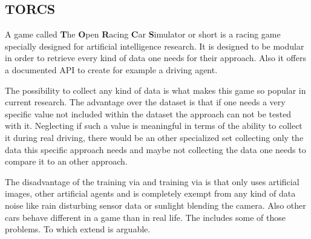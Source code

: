 \subsection{TORCS} \label{subsec: TORCS}

A game called \textbf{T}he \textbf{O}pen \textbf{R}acing \textbf{C}ar \textbf{S}imulator or short \torcs is a racing game specially designed for artificial intelligence research. It is designed to be modular in order to retrieve every kind of data one needs for their approach. Also it offers a documented API to create for example a driving agent. 

The possibility to collect any kind of data is what makes this game so popular in current research. The advantage over the \kitti dataset is that if one needs a very specific value not included within the \kitti dataset the approach can not be tested with it. Neglecting if such a value is meaningful in terms of the ability to collect it during real driving, there would be an other specialized set collecting only the data this specific approach needs and maybe not collecting the data one needs to compare it to an other approach.

The disadvantage of the training via \torcs and training via \kitti is that \torcs only uses artificial images, other artificial agents and is completely exempt from any kind of data noise like rain disturbing sensor data or sunlight blending the camera. Also other cars behave different in a game than in real life. The \kitti includes some of those problems. To which extend is arguable. \cite{wymann2000torcs}

%
